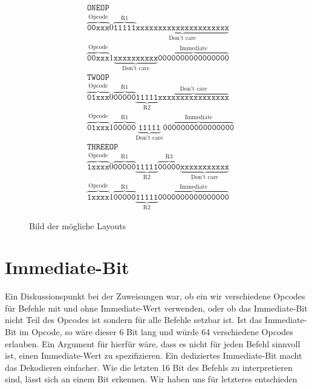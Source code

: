 \documentclass[paper=a4,fontsize=12pt,twocolumn]{scrreprt}
\begin{document}
\begin{figure}[h]
\centering
\begin{align*}
&\texttt{ONEOP}\\
&\overbrace{\texttt{00xxx}}^\text{Opcode}
0
\overbrace{\texttt{11111}}^\text{R1}
\underbrace{\texttt{xxxxxxxxxxxxxxxxxxxxx}}_\text{Don't care}\\
&\overbrace{\texttt{00xxx}}^\text{Opcode}
1
\underbrace{\texttt{xxxxxxxxxx}}_\text{Don't care}
\overbrace{\texttt{0000000000000000}}^\text{Immediate}\\
&\texttt{TWOOP}\\
&\overbrace{\texttt{01xxx}}^\text{Opcode}
0
\overbrace{\texttt{00000}}^\text{R1}
\underbrace{\texttt{11111}}_\text{R2}
\overbrace{\texttt{xxxxxxxxxxxxxxxx}}^\text{Don't care}\\
&\overbrace{\texttt{01xxx}}^\text{Opcode}
1
\overbrace{\texttt{00000}}^\text{R1}
\underbrace{\texttt{11111}}_\text{Don't care}
\overbrace{\texttt{0000000000000000}}^\text{Immediate}\\
&\texttt{THREEOP}\\
&\overbrace{\texttt{1xxxx}}^\text{Opcode}
0
\overbrace{\texttt{00000}}^\text{R1}
\underbrace{\texttt{11111}}_\text{R2}
\overbrace{\texttt{00000}}^\text{R3}
\underbrace{\texttt{xxxxxxxxxxx}}_\text{Don't care}\\
&\overbrace{\texttt{1xxxx}}^\text{Opcode}
1
\overbrace{\texttt{00000}}^\text{R1}
\underbrace{\texttt{11111}}_\text{R2}
\overbrace{\texttt{0000000000000000}}^\text{Immediate}
\end{align*}
\label{fig:op_code_structure}
\caption{Bild der mögliche Layouts}
\end{figure}

\section{Immediate-Bit}
\label{sec:immediate_bit}
Ein Diskussionspunkt bei der Zuweisungen war, ob ein wir verschiedene Opcodes für Befehle mit und ohne Immediate-Wert verwenden, oder ob das Immediate-Bit nicht Teil des Opcodes ist sondern für alle Befehle setzbar ist.
Ist das Immediate-Bit im Opcode, so wäre dieser 6 Bit lang und würde 64 verschiedene Opcodes erlauben.
Ein Argument für hierfür wäre, dass es nicht für jeden Befehl sinnvoll ist, einen Immediate-Wert zu spezifizieren.
Ein dediziertes Immediate-Bit macht das Dekodieren einfacher.
Wie die letzten 16 Bit des Befehls zu interpretieren sind, lässt sich an einem Bit erkennen.
Wir haben uns für letzteres entschieden
\end{document}
